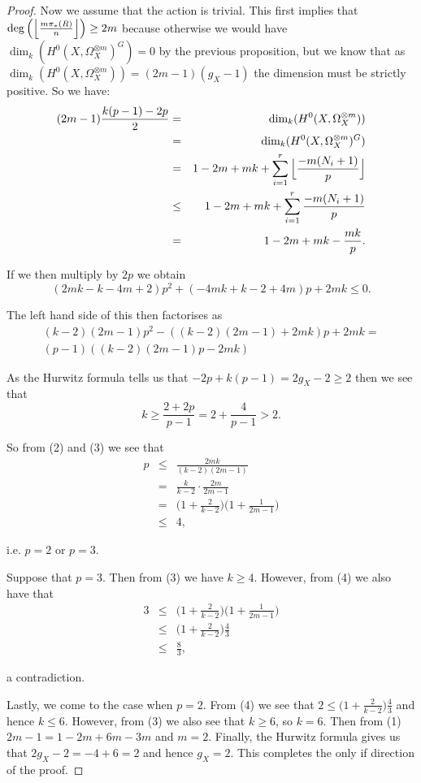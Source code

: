 \documentclass[11pt]{article} %
\begin{document}
\begin{proof}
Now we assume that the action is trivial. This first implies that $\deg\Big(\Big{\lfloor}\frac{m\pi_*(R)}{n}\Big{\rfloor}\Big)\geq 2m$ because otherwise we would have $\dim_k(H^0(X,\Omega_X^{\otimes m})^G)=0$ by the previous proposition, but we know that as $\dim_k(H^0(X,\Omega_X^{\otimes m}))=(2m-1)(g_X-1)$ the dimension must be strictly positive. So we have:
	\begin{eqnarray}
		(2m-1)\frac{k(p-1)-2p}{2} & = & \dim_k(H^0(X,\Omega_X^{\otimes m})) \nonumber\\
		& = & \dim_k(H^0(X,\Omega_X^{\otimes m})^G) \nonumber\\
		& = & 1-2m+mk+\sum_{i=1}^r\Big{\lfloor}\frac{-m(N_i+1)}{p}\Big{\rfloor}\nonumber \\
		& \leq & 1-2m+mk+\sum_{i=1}^r\frac{-m(N_i+1)}{p}\nonumber \\
		& = & 1-2m+mk-\frac{mk}{p}.
	\end{eqnarray}

If we then multiply by $2p$ we obtain
	\begin{equation}
		(2mk-k-4m+2)p^2+(-4mk+k-2+4m)p+2mk\leq 0.
	\end{equation}

The left hand side of this then factorises as
	\begin{multline*}
		(k-2)(2m-1)p^2-((k-2)(2m-1)+2mk)p+2mk = \\
		(p-1)((k-2)(2m-1)p-2mk)
	\end{multline*}

As the Hurwitz formula tells us that $-2p+k(p-1)=2g_X-2 \geq 2$ then we see that 
	\begin{equation}
		k\geq \frac{2+2p}{p-1}=2+\frac{4}{p-1}>2.
	\end{equation}

So from (2) and (3) we see that
	\begin{eqnarray}
		p & \leq & \frac{2mk}{(k-2)(2m-1)}\nonumber\\
		& = & \frac{k}{k-2}\cdot\frac{2m}{2m-1}\nonumber\\
		& = & \Big( 1+\frac{2}{k-2} \Big) \Big(1+\frac{1}{2m-1} \Big)\\
		& \leq & 4, \nonumber
	\end{eqnarray}

i.e. $p=2$ or $p=3$. 

Suppose that $p=3$. Then from (3) we have $k\geq 4$. However, from (4) we also have that 
	\begin{eqnarray*}
		3 & \leq &\Big( 1+\frac{2}{k-2} \Big) \Big(1+\frac{1}{2m-1} \Big)\\
		& \leq & \Big( 1+\frac{2}{k-2} \Big) \frac{4}{3}\\
		& \leq & \frac{8}{3},
	\end{eqnarray*}

a contradiction.

Lastly, we come to the case when $p=2$. From (4) we see that $2\leq \Big(1+\frac{2}{k-2}\Big)\frac{4}{3}$ and hence $k\leq 6$. However, from (3) we also see that $k\geq 6$, so $k=6$. Then from (1) $2m-1=1-2m+6m-3m$ and $m=2$. Finally, the Hurwitz formula gives us that $2g_X-2=-4+6=2$ and hence $g_X=2$. This completes the only if direction of the proof.
\end{proof}



\end{document}
